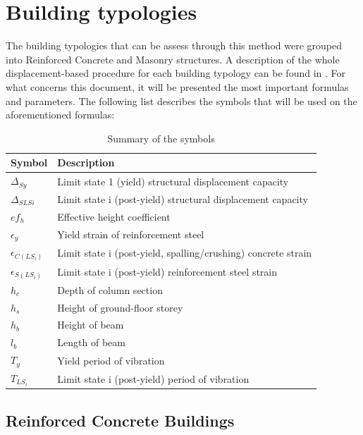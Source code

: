 \section{Building typologies}
The building typologies that can be assess through this method were grouped into Reinforced Concrete and Masonry structures. A description of the whole displacement-based procedure for each building typology can be found in \citep{Baletal2010}. For what concerns this document, it will be presented the most important formulas and parameters. The following list describes the symbols that will be used on the aforementioned formulas:

\begin{table}[ht]
\caption{Summary of the symbols}
\centering
\begin{tabular}[ht]{ll}
Symbol & Description \\[0.5ex]\hline
$\Delta_{Sy}$ & Limit state 1 (yield) structural displacement capacity\\
$\Delta_{SLSi}$ & Limit state i (post-yield) structural displacement capacity\\ 
$ef_h$ & Effective height coefficient\\
$\epsilon_y$ & Yield strain of reinforcement steel\\
$\epsilon_{C\left({LS_i}\right)}$ & Limit state i (post-yield, spalling/crushing) concrete strain\\ 
$\epsilon_{S\left({LS_i}\right)}$ & Limit state i (post-yield)  reinforcement steel strain\\ 
$h_c$ & Depth of column section\\
$h_s$ & Height of ground-floor storey\\
$h_b$ & Height of beam\\
$l_b$ & Length of beam\\
$T_y$ &Yield period of vibration\\
$T_{LS_i}$ & Limit state i (post-yield) period of vibration
\end{tabular}
\label{table:SymbolTable}
\end{table}

\subsection{Reinforced Concrete Buildings}


